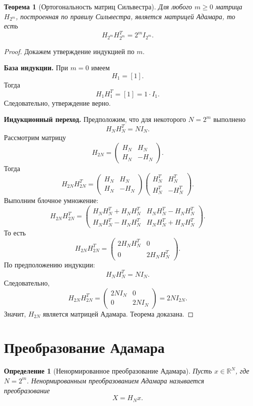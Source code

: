 \documentclass[12pt,a4paper]{article}
\newtheorem{definition}{Определение}
\newtheorem{theorem}{Теорема}
\begin{document}
\begin{theorem}[Ортогональность матриц Сильвестра]
Для любого $m\ge 0$ матрица $H_{2^m}$, построенная по правилу Сильвестра, является матрицей Адамара, то есть
\[
    H_{2^m}H_{2^m}^T = 2^m I_{2^m}.
\]
\end{theorem}

\begin{proof}
Докажем утверждение индукцией по $m$.

\textbf{База индукции.} При $m=0$ имеем
\[
    H_1=[1].
\]
Тогда
\[
    H_1H_1^T=[1]=1\cdot I_1.
\]
Следовательно, утверждение верно.

\textbf{Индукционный переход.} Предположим, что для некоторого $N=2^m$ выполнено
\[
    H_NH_N^T = N I_N.
\]
Рассмотрим матрицу
\[
    H_{2N}=
    \begin{pmatrix}
        H_N&H_N\\
        H_N&-H_N
    \end{pmatrix}.
\]
Тогда
\[
H_{2N}H_{2N}^T
=
\begin{pmatrix}
H_N&H_N\\
H_N&-H_N
\end{pmatrix}
\begin{pmatrix}
H_N^T&H_N^T\\
H_N^T&-H_N^T
\end{pmatrix}.
\]
Выполним блочное умножение:
\[
H_{2N}H_{2N}^T
=
\begin{pmatrix}
H_NH_N^T+H_NH_N^T
&
H_NH_N^T-H_NH_N^T
\\
H_NH_N^T-H_NH_N^T
&
H_NH_N^T+H_NH_N^T
\end{pmatrix}.
\]
То есть
\[
H_{2N}H_{2N}^T
=
\begin{pmatrix}
2H_NH_N^T&0\\
0&2H_NH_N^T
\end{pmatrix}.
\]
По предположению индукции:
\[
    H_NH_N^T = NI_N.
\]
Следовательно,
\[
H_{2N}H_{2N}^T
=
\begin{pmatrix}
2NI_N&0\\
0&2NI_N
\end{pmatrix}
=
2N I_{2N}.
\]
Значит, $H_{2N}$ является матрицей Адамара. Теорема доказана.
\end{proof}

\section{Преобразование Адамара}

\begin{definition}[Ненормированное преобразование Адамара]
Пусть $x\in\mathbb{R}^N$, где $N=2^m$. Ненормированным преобразованием Адамара называется преобразование
\[
    X = H_N x.
\]
\end{definition}
\end{document}
